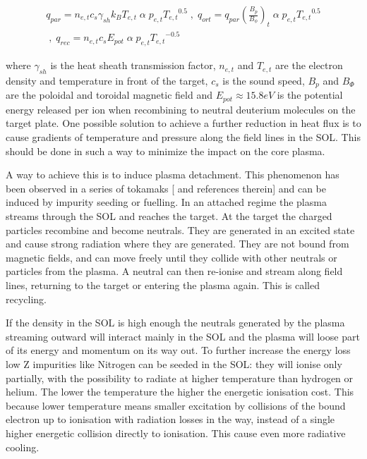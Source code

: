 \begin{equation}
\begin{split}
{ q } _{ par } = { n } _{ e,t } { c } _{ s } {  \gamma  } _{ sh }{ k } _{ B }{ T } _{ e,t } \; \alpha \; { p } _{ e,t }{{ T } _{ e,t }}^{0.5 }  \;,\; { q } _{ ort } = { q } _{ par } \left( \frac {{ B } _{ p }} {{  B  }_{ \phi  }}   \right) _{ t} \; \alpha \; { p } _{ e,t }{{ T } _{ e,t }}^{0.5 } \\ \;,\; { q } _{ rec } = { n } _{ e,t } { c } _{ s } {  E  } _{ pot } \; \alpha \; { p } _{ e,t }{{ T } _{ e,t }}^{-0.5 }
\end{split}
\label{eq:detachment}
\end{equation}

where $\gamma_{sh}$ is the heat sheath transmission factor, $n_{e,t}$ and $T_{e,t}$ are the electron density and temperature in front of the target, $c_s$ is the sound speed, $B_p$ and $B_{\Phi}$ are the poloidal and toroidal magnetic field and $E_{pot} \approx 15.8 eV$ is the potential energy released per ion when recombining to neutral deuterium molecules on the target plate. \cite{Reimold2015} One possible solution to achieve a further reduction in heat flux is to cause gradients of temperature and pressure along the field lines in the SOL. This should be done in such a way to minimize the impact on the core plasma.

A way to achieve this is to induce plasma detachment. This phenomenon has been observed in a series of tokamaks [\cite{Reimold2015} and references therein] and can be induced by impurity seeding or fuelling.
In an attached regime the plasma streams through the SOL and reaches the target. At the target the charged particles recombine and become neutrals. They are generated in an excited state and cause strong radiation where they are generated. They are not bound from magnetic fields, and can move freely until they collide with other neutrals or particles from the plasma. A neutral can then re-ionise and stream along field lines, returning to the target or entering the plasma again. This is called recycling.

If the density in the SOL is high enough the neutrals generated by the plasma streaming outward will interact mainly in the SOL and the plasma will loose part of its energy and momentum on its way out. To further increase the energy loss low Z impurities like Nitrogen can be seeded in the SOL: they will ionise only partially, with the possibility to radiate at higher temperature than hydrogen or helium. The lower the temperature the higher the energetic ionisation cost. This because lower temperature means smaller excitation by collisions  of the bound electron up to ionisation with radiation losses in the way, instead of a single higher energetic collision directly to ionisation. This cause even more radiative cooling. 

